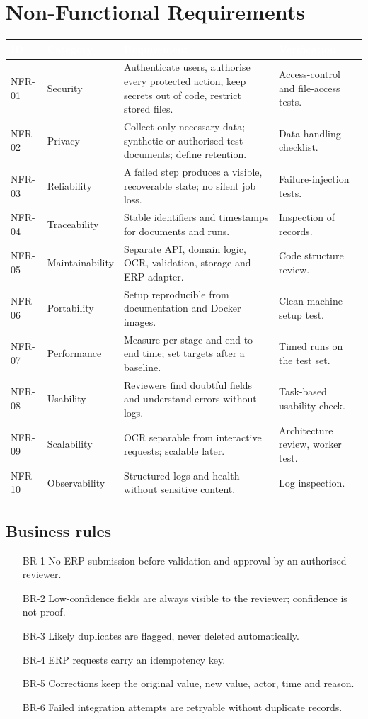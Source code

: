 \documentclass[11pt,a4paper]{report}
\newcommand{\hdr}[1]{\textcolor{white}{\sffamily\bfseries #1}}
\newcommand{\tblstart}{\rowcolors{2}{white}{rowgray}\arrayrulecolor{teal!60}}
\newcommand{\hdrrow}{\rowcolor{navy}}
\begin{document}
\chapter{Non-Functional Requirements}
{\tblstart\small
\begin{longtable}{L{1.6cm}L{2.4cm}L{5.0cm}L{4.6cm}}
\hdrrow \hdr{ID} & \hdr{Category} & \hdr{Requirement} & \hdr{Verification}\\ \endhead
NFR-01 & Security & Authenticate users, authorise every protected action, keep secrets out of code, restrict stored files. & Access-control and file-access tests.\\
NFR-02 & Privacy & Collect only necessary data; synthetic or authorised test documents; define retention. & Data-handling checklist.\\
NFR-03 & Reliability & A failed step produces a visible, recoverable state; no silent job loss. & Failure-injection tests.\\
NFR-04 & Traceability & Stable identifiers and timestamps for documents and runs. & Inspection of records.\\
NFR-05 & Maintainability & Separate API, domain logic, OCR, validation, storage and ERP adapter. & Code structure review.\\
NFR-06 & Portability & Setup reproducible from documentation and Docker images. & Clean-machine setup test.\\
NFR-07 & Performance & Measure per-stage and end-to-end time; set targets after a baseline. & Timed runs on the test set.\\
NFR-08 & Usability & Reviewers find doubtful fields and understand errors without logs. & Task-based usability check.\\
NFR-09 & Scalability & OCR separable from interactive requests; scalable later. & Architecture review, worker test.\\
NFR-10 & Observability & Structured logs and health without sensitive content. & Log inspection.\\
\hline
\end{longtable}}

\section{Business rules}
\begin{enumerate}
\item[BR-1] No ERP submission before validation and approval by an authorised reviewer.
\item[BR-2] Low-confidence fields are always visible to the reviewer; confidence is not proof.
\item[BR-3] Likely duplicates are flagged, never deleted automatically.
\item[BR-4] ERP requests carry an idempotency key.
\item[BR-5] Corrections keep the original value, new value, actor, time and reason.
\item[BR-6] Failed integration attempts are retryable without duplicate records.
\end{enumerate}
\end{document}
